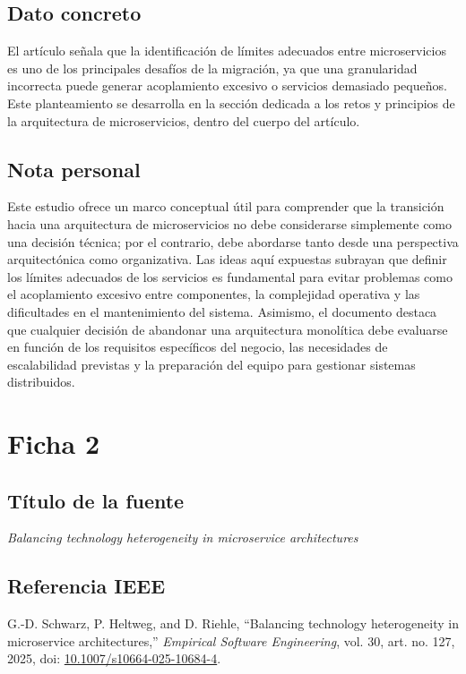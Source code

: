 \documentclass[11pt]{article}
\begin{document}
\subsection*{Dato concreto}
El artículo señala que la identificación de límites adecuados entre microservicios es uno de los principales desafíos de la migración, ya que una granularidad incorrecta puede generar acoplamiento excesivo o servicios demasiado pequeños. Este planteamiento se desarrolla en la sección dedicada a los retos y principios de la arquitectura de microservicios, dentro del cuerpo del artículo.

\subsection*{Nota personal}
Este estudio ofrece un marco conceptual útil para comprender que la transición hacia una arquitectura de microservicios no debe considerarse simplemente como una decisión técnica; por el contrario, debe abordarse tanto desde una perspectiva arquitectónica como organizativa. Las ideas aquí expuestas subrayan que definir los límites adecuados de los servicios es fundamental para evitar problemas como el acoplamiento excesivo entre componentes, la complejidad operativa y las dificultades en el mantenimiento del sistema. Asimismo, el documento destaca que cualquier decisión de abandonar una arquitectura monolítica debe evaluarse en función de los requisitos específicos del negocio, las necesidades de escalabilidad previstas y la preparación del equipo para gestionar sistemas distribuidos.


\section*{Ficha 2}

\subsection*{Título de la fuente}
\textit{Balancing technology heterogeneity in microservice architectures}

\subsection*{Referencia IEEE}
G.-D. Schwarz, P. Heltweg, and D. Riehle, ``Balancing technology heterogeneity in microservice architectures,'' \textit{Empirical Software Engineering}, vol. 30, art. no. 127, 2025, doi: \href{https://doi.org/10.1007/s10664-025-10684-4}{10.1007/s10664-025-10684-4}.
\end{document}
